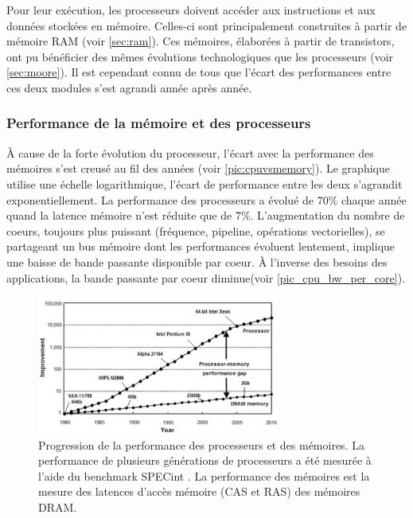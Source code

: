 Pour leur exécution, les processeurs doivent accéder aux instructions et aux données stockées en mémoire. Celles-ci sont principalement construites à partir de mémoire RAM (voir \autoref{sec:ram}). Ces mémoires, élaborées à partir de transistors, ont pu bénéficier des mêmes évolutions technologiques que les processeurs (voir \autoref{sec:moore}). Il est cependant connu de tous que l'écart des performances entre ces deux modules s'est agrandi année après année. 


\subsubsection{Performance de la mémoire et des processeurs}

À cause de la forte évolution du processeur, l'écart avec la performance des mémoires s'est creusé au fil des années (voir \autoref{pic:cpuvsmemory}). Le graphique utilise une échelle logarithmique, l'écart de performance entre les deux s’agrandit exponentiellement. La performance des processeurs a évolué de 70\% chaque année quand la latence mémoire n’est réduite que de 7\%.
L’augmentation du nombre de coeurs, toujours plus puissant (fréquence, pipeline, opérations vectorielles), se partageant un bus mémoire dont les performances évoluent lentement, implique une baisse de bande passante disponible par coeur. À l’inverse des besoins des applications, la bande passante par coeur diminue(voir \autoref{pic_cpu_bw_per_core}). 
 

 \begin{figure}
    \center
    \includegraphics[width=8cm]{images/cpu_cpu_vs_memory.png}
    \caption{\label{pic:cpuvsmemory} Progression de la performance des processeurs et des mémoires. La performance de plusieurs générations de processeurs a été mesurée à l'aide du benchmark SPECint \cite{Efnusheva2017ASO}. La performance des mémoires est la mesure des latences d’accès mémoire (CAS et RAS) des mémoires DRAM.}
\end{figure}



